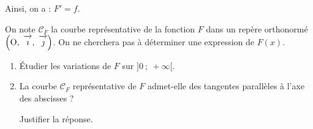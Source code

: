 \documentclass[10pt,a4paper,french]{article}
\newcommand{\vect}[1]{\overrightarrow{\,\mathstrut#1\,}}
\def\Oij{$\left(\text{O},~\vect{\imath},~\vect{\jmath}\right)$}
\begin{document}
Ainsi, on a : $F' = f$.

On note $\mathcal{C}_F$ la courbe représentative de la fonction $F$ dans un repère orthonormé \Oij. On ne cherchera pas à déterminer une expression de $F(x)$.

\medskip

\begin{enumerate}
\item Étudier les variations de $F$ sur $]0~;~ +\infty[$.
\item La courbe $\mathcal{C}_F$ représentative  de $F$ admet-elle des tangentes parallèles à l'axe des abscisses ?

Justifier la réponse.
\end{enumerate}
\end{document}
